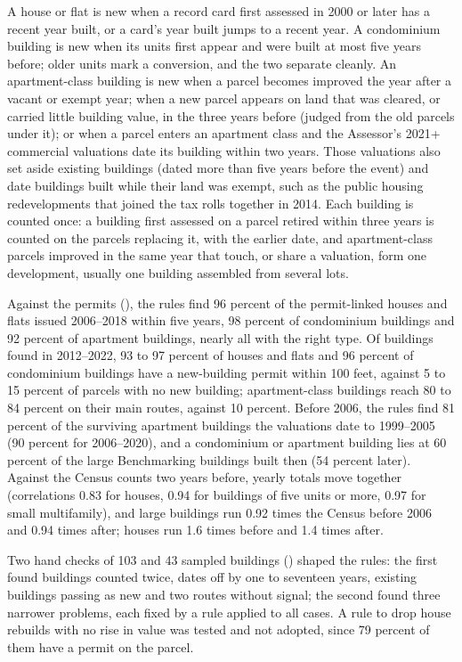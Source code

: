 A house or flat is new when a record card first assessed in 2000 or later has a recent year built, or a card's year
built jumps to a recent year. A condominium building is new when its units first appear and were built at most five
years before; older units mark a conversion, and the two separate cleanly. An apartment-class building is new when a
parcel becomes improved the year after a vacant or exempt year; when a new parcel appears on land that was cleared, or
carried little building value, in the three years before (judged from the old parcels under it); or when a parcel
enters an apartment class and the Assessor's 2021+ commercial valuations date its building within two years. Those
valuations also set aside existing buildings (dated more than five years before the event) and date buildings built
while their land was exempt, such as the public housing redevelopments that joined the tax rolls together in 2014.
Each building is counted once: a building first assessed on a parcel retired within three years is counted on the
parcels replacing it, with the earlier date, and apartment-class parcels improved in the same year that touch, or
share a valuation, form one development, usually one building assembled from several lots.

Against the permits (), the rules find 96 percent of the permit-linked
houses and flats issued 2006--2018 within five years, 98 percent of condominium buildings and 92 percent of apartment
buildings, nearly all with the right type. Of buildings found in 2012--2022, 93 to 97 percent of houses and flats and
96 percent of condominium buildings have a new-building permit within 100 feet, against 5 to 15 percent of parcels with
no new building; apartment-class buildings reach 80 to 84 percent on their main routes, against 10 percent. Before
2006, the rules find 81 percent of the surviving apartment buildings the valuations date to 1999--2005 (90 percent for
2006--2020), and a condominium or apartment building lies at 60 percent of the large Benchmarking buildings built then
(54 percent later). Against the Census counts two years before, yearly totals move together (correlations 0.83 for
houses, 0.94 for buildings of five units or more, 0.97 for small multifamily), and large buildings run 0.92 times the
Census before 2006 and 0.94 times after; houses run 1.6 times before and 1.4 times after.

Two hand checks of 103 and 43 sampled buildings () shaped
the rules: the first found buildings counted twice, dates off by one to seventeen years, existing buildings passing as
new and two routes without signal; the second found three narrower problems, each fixed by a rule applied to all
cases. A rule to drop house rebuilds with no rise in value was tested and not adopted, since 79 percent of them have a
permit on the parcel.

